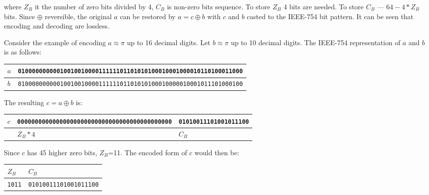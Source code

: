 \documentclass[conference]{IEEEtran}
\begin{document}
\noindent where \(Z_B\) it the number of zero bits divided by 4, \(C_B\) is non-zero bits sequence.
To store \(Z_B\) 4 bits are needed. To store \(C_B\) --- \(64 - 4*Z_B\) bits. 
Since \(\oplus\) reversible, the original \(a\) can be restored by \(a = c \oplus b\) with \(c\)
and \(b\) casted to the IEEE-754 bit pattern. It can be seen that encoding and decoding are lossless.

Consider the example of encoding \(a \approx \pi\) up to 16 decimal digits. Let \(b\approx \pi\) 
up to 10 decimal digits. The IEEE-754 representation of \(a\) and \(b\) is as follows:

\begin{table}[!h]
	\centering
	\fontsize{5.5}{1.2} {
		\begin{tabularx}{\columnwidth}{ 
				| >{\raggedleft\arraybackslash}l 
				| >{\raggedright\arraybackslash}X |}
			\hline
			\(a\) & \texttt{0100000000001001001000011111101101010100010001000010110100011000} \\
			\hline
			\(b\) & \texttt{0100000000001001001000011111101101010100010000010001011101000100} \\
			\hline
		\end{tabularx}
	}
\end{table}

The resulting \(c=a \oplus b\) is:

\begin{table}[!h]
	\centering
	\fontsize{5.5}{1.2} {
		\begin{tabularx}{\columnwidth}{ 
				| >{\raggedleft\arraybackslash}l 
				| >{\raggedright\arraybackslash}l 
				| >{\raggedright\arraybackslash}X |}
			\hline
			\(c\) & \texttt{00000000000000000000000000000000000000000000} & \texttt{01010011101001011100} \\
			\hline
			& \multicolumn{1}{c|} {\(Z_B * 4\)} & \multicolumn{1}{c|} {\(C_B\)} \\ 
			\hline
		\end{tabularx}
	}
\end{table}

Since \(c\) has 45 higher zero bits, \(Z_B\)=11. The encoded form of \(c\) would then be:

\begin{table}[!h]
	\centering
	\fontsize{5.5}{1.2} {
		\begin{tabularx}{0.4\columnwidth}{ 
				| >{\raggedright\arraybackslash}l 
				| >{\raggedright\arraybackslash}X |}
			\hline
			\multicolumn{1}{|c|} {\(Z_B\)} & \multicolumn{1}{c|} {\(C_B\)} \\ 
			\hline
			\texttt{1011} & \texttt{01010011101001011100} \\
			\hline
		\end{tabularx}
	}
\end{table}
\end{document}
